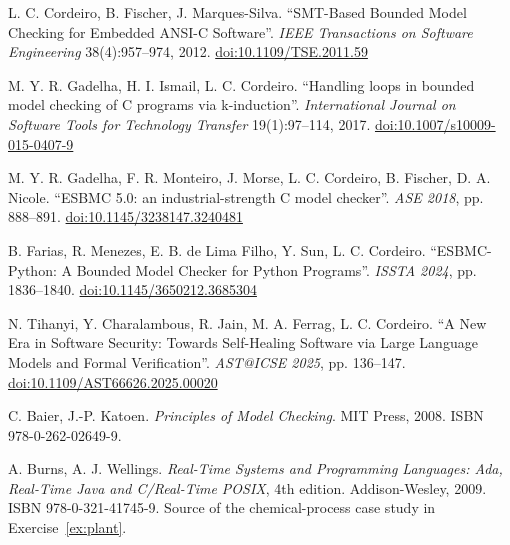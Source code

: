 \documentclass[11pt,a4paper]{article}
\begin{document}
\sloppy
\begin{enumerate}[leftmargin=2.4em,itemsep=3pt,label={[\arabic*]}]
  \item L. C. Cordeiro, B. Fischer, J. Marques-Silva. ``SMT-Based Bounded Model
        Checking for Embedded ANSI-C Software''. \emph{IEEE Transactions on
        Software Engineering} 38(4):957--974, 2012.
        \href{https://doi.org/10.1109/TSE.2011.59}{doi:10.1109/TSE.2011.59}
  \item M. Y. R. Gadelha, H. I. Ismail, L. C. Cordeiro. ``Handling loops in
        bounded model checking of C programs via k-induction''.
        \emph{International Journal on Software Tools for Technology Transfer}
        19(1):97--114, 2017.
        \href{https://doi.org/10.1007/s10009-015-0407-9}{doi:10.1007/s10009-015-0407-9}
  \item M. Y. R. Gadelha, F. R. Monteiro, J. Morse, L. C. Cordeiro, B. Fischer,
        D. A. Nicole. ``ESBMC 5.0: an industrial-strength C model checker''.
        \emph{ASE 2018}, pp. 888--891.
        \href{https://doi.org/10.1145/3238147.3240481}{doi:10.1145/3238147.3240481}
  \item B. Farias, R. Menezes, E. B. de Lima Filho, Y. Sun, L. C. Cordeiro.
        ``ESBMC-Python: A Bounded Model Checker for Python Programs''.
        \emph{ISSTA 2024}, pp. 1836--1840.
        \href{https://doi.org/10.1145/3650212.3685304}{doi:10.1145/3650212.3685304}
  \item N. Tihanyi, Y. Charalambous, R. Jain, M. A. Ferrag, L. C. Cordeiro.
        ``A New Era in Software Security: Towards Self-Healing Software via
        Large Language Models and Formal Verification''. \emph{AST@ICSE 2025},
        pp. 136--147.
        \href{https://doi.org/10.1109/AST66626.2025.00020}{doi:10.1109/AST66626.2025.00020}
  \item C. Baier, J.-P. Katoen. \emph{Principles of Model Checking}. MIT Press,
        2008. ISBN 978-0-262-02649-9.
  \item A. Burns, A. J. Wellings. \emph{Real-Time Systems and Programming
        Languages: Ada, Real-Time Java and C/Real-Time POSIX}, 4th edition.
        Addison-Wesley, 2009. ISBN 978-0-321-41745-9. Source of the
        chemical-process case study in Exercise~\ref{ex:plant}.
\end{enumerate}
\end{document}
